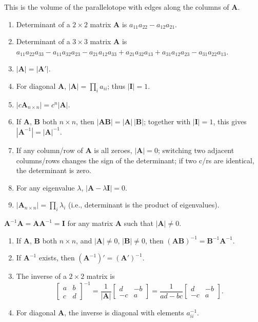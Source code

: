 \documentclass[8pt,letterpaper, landscape]{extarticle} %
\newcommand{\mA}{\ensuremath{\mathbf{A}}}
\newcommand{\mB}{\ensuremath{\mathbf{B}}}
\newcommand{\mI}{\ensuremath{\mathbf{I}}}
\begin{document}
\begin{multicols}{3}
\begin{description}
This is the volume of the parallelotope with edges along the columns of $ \mA $.
\begin{enumerate}
\item Determinant of a $ 2 \times 2 $ matrix $ \mA $ is $ a_{11} a_{22} - a_{12} a_{21} $.
\item Determinant of a $ 3 \times 3 $ matrix $ \mA $ is $
  a_{11} a_{22} a_{33}
- a_{11} a_{32} a_{23}
- a_{21} a_{12} a_{33}
+ a_{21} a_{32} a_{13}
+ a_{31} a_{12} a_{23}
- a_{31} a_{22} a_{13}
$.
\item $ | \mA | = | \mA' | $.
\item For diagonal $ \mA $, $ | \mA | = \prod_i a_{ii} $; thus $ | \mI | = 1 $.
\item $ | c \mA_{n \times n} | = c^n | \mA | $.
\item If $ \mA $, $ \mB $ both $ n \times n $, then $ | \mA \mB | = | \mA | \, | \mB | $; together with $ | \mI | = 1 $, this gives $ | \mA^{-1} | = | \mA |^{-1} $.
\item If any column/row of $ \mA $ is all zeroes, $ | \mA | = 0 $; switching two adjacent columns/rows changes the sign of the determinant; if two c/rs are identical, the determinant is zero.
\item For any eigenvalue $ \lambda $, $ | \mA - \lambda \mI | = 0 $.
\item $ | \mA_{n \times n} | = \prod_i \lambda_i $ (i.e., determinant is the product of eigenvalues).
\end{enumerate}

 $ \mA^{-1}\mA = \mA \mA^{-1} = \mI $ for any matrix $ \mA $ such that $ | \mA | \neq 0 $.
\begin{enumerate}
\item If $ \mA $, $ \mB $ both $ n \times n $, and $ | \mA | \neq 0 $, $ | \mB | \neq 0 $, then $ (\mA \mB)^{-1} = \mB^{-1} \mA^{-1} $.
\item If $ \mA^{-1} $ exists, then $ (\mA^{-1})' = (\mA')^{-1} $.
\item The inverse of a $ 2 \times 2 $ matrix is
$$ \begin{bmatrix}
a & b \\ 
c & d
\end{bmatrix}^{-1} =
\frac{1}{| \mA |}
\begin{bmatrix}
d & -b \\ 
-c & a
\end{bmatrix}
=
\frac{1}{ad - bc}
\begin{bmatrix}
d & -b \\ 
-c & a
\end{bmatrix} . $$
\item For diagonal $ \mA $, the inverse is diagonal with elements $ a_{ii}^{-1} $.
\end{enumerate}


\end{description}
\end{multicols}
\end{document}
